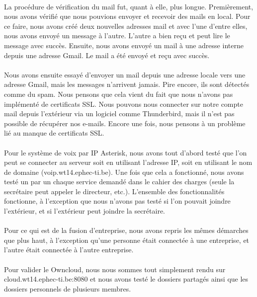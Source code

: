 \documentclass[a4paper,12pt]{article}
\begin{document}
	\paragraph{} La procédure de vérification du mail fut, quant à elle, plus longue. Premièrement,
nous avons vérifié que nous pouvions envoyer et recevoir des mails en local. Pour ce
faire, nous avons créé deux nouvelles adresses mail et avec l’une d’entre elles, nous
avons envoyé un message à l’autre. L’autre a bien reçu et peut lire le message avec
succès. Ensuite, nous avons envoyé un mail à une adresse interne depuis une adresse
Gmail. Le mail a été envoyé et reçu avec succès.
	\paragraph{} Nous avons ensuite essayé d’envoyer un mail depuis une adresse locale vers une
adresse Gmail, mais les messages n’arrivent jamais. Pire encore, ils sont détectés
comme du spam. Nous pensons que cela vient du fait que nous n’avons pas implémenté
de certificats SSL. Nous pouvons nous connecter sur notre compte mail
depuis l’extérieur via un logiciel comme Thunderbird, mais il n’est pas possible de
récupérer nos e-mails. Encore une fois, nous pensons à un problème lié au manque
de certificats SSL.
	\paragraph{} Pour le système de voix par IP Asterisk, nous avons tout d’abord testé que l’on
peut se connecter au serveur soit en utilisant l’adresse IP, soit en utilisant le nom de
domaine (voip.wt14.ephec-ti.be). Une fois que cela a fonctionné, nous avons testé un
par un chaque service demandé dans le cahier des charges (seule la secrétaire peut
appeler le directeur, etc.). L’ensemble des fonctionnalités fonctionne, à l’exception
que nous n’avons pas testé si l’on pouvait joindre l’extérieur, et si l’extérieur peut
joindre la secrétaire.
	\paragraph{} Pour ce qui est de la fusion d’entreprise, nous avons repris les mêmes démarches
que plus haut, à l’exception qu’une personne était connectée à une entreprise, et
l’autre était connectée à l’autre entreprise.

	\paragraph{} Pour valider le Owncloud, nous nous sommes tout simplement rendu sur cloud.wt14.ephec-ti.be:8080 et nous avons testé le dossiers partagés ainsi que les dossiers personnels de plusieurs membres.
\end{document}
